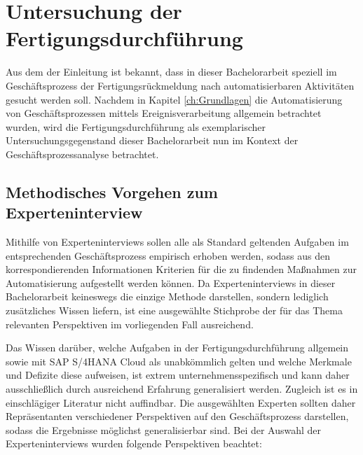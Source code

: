 \section{Untersuchung der Fertigungsdurchführung}\label{sec:untersuchung}


Aus dem der Einleitung ist bekannt, dass in dieser Bachelorarbeit speziell im Geschäftsprozess der Fertigungsrückmeldung nach automatisierbaren Aktivitäten gesucht werden soll. 
Nachdem in Kapitel \ref{ch:Grundlagen} die Automatisierung von Geschäftsprozessen mittels Ereignisverarbeitung allgemein betrachtet wurden, wird die Fertigungsdurchführung als exemplarischer Untersuchungsgegenstand dieser Bachelorarbeit nun im Kontext der Geschäftsprozessanalyse betrachtet. 

\subsection{Methodisches Vorgehen zum Experteninterview}

Mithilfe von Experteninterviews sollen alle als Standard geltenden Aufgaben im entsprechenden Geschäftsprozess empirisch erhoben werden, sodass aus den korrespondierenden Informationen Kriterien für die zu findenden Maßnahmen zur Automatisierung aufgestellt werden können. 
Da Experteninterviews in dieser Bachelorarbeit keineswegs die einzige Methode darstellen, sondern lediglich zusätzliches Wissen liefern, ist eine ausgewählte Stichprobe der für das Thema relevanten Perspektiven im vorliegenden Fall ausreichend.

Das Wissen darüber, welche Aufgaben in der Fertigungsdurchführung allgemein sowie mit SAP S/4HANA Cloud als unabkömmlich gelten und welche Merkmale und Defizite diese aufweisen, ist extrem unternehmensspezifisch und kann daher ausschließlich durch ausreichend Erfahrung generalisiert werden. 
Zugleich ist es in einschlägiger Literatur nicht auffindbar.
Die ausgewählten Experten sollten daher Repräsentanten verschiedener Perspektiven auf den Geschäftsprozess darstellen, sodass die Ergebnisse möglichst generalisierbar sind. 
Bei der Auswahl der Experteninterviews wurden folgende Perspektiven beachtet:

